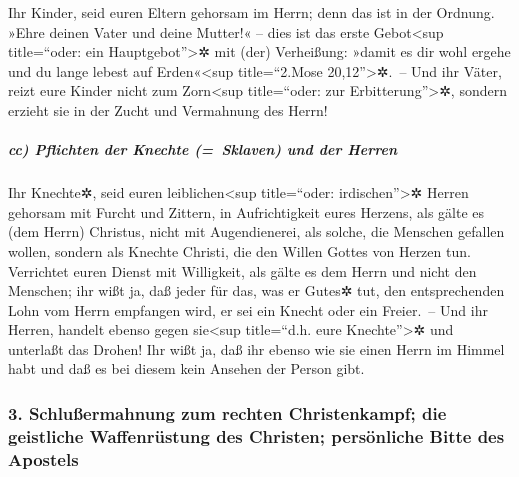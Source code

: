  Ihr Kinder, seid euren Eltern gehorsam im Herrn; denn das
ist in der Ordnung.  »Ehre deinen Vater und deine Mutter!«
-- dies ist das erste Gebot\textless sup title=``oder: ein
Hauptgebot''\textgreater✲ mit (der) Verheißung:  »damit es
dir wohl ergehe und du lange lebest auf Erden«\textless sup
title=``2.Mose 20,12''\textgreater✲.~--  Und ihr Väter,
reizt eure Kinder nicht zum Zorn\textless sup title=``oder: zur
Erbitterung''\textgreater✲, sondern erzieht sie in der Zucht und
Vermahnung des Herrn!

\hypertarget{cc-pflichten-der-knechte-sklaven-und-der-herren}{%
\subparagraph{cc) Pflichten der Knechte (=~Sklaven) und der
Herren}\label{cc-pflichten-der-knechte-sklaven-und-der-herren}}

 Ihr Knechte✲, seid euren leiblichen\textless sup
title=``oder: irdischen''\textgreater✲ Herren gehorsam mit Furcht und
Zittern, in Aufrichtigkeit eures Herzens, als gälte es (dem Herrn)
Christus,  nicht mit Augendienerei, als solche, die
Menschen gefallen wollen, sondern als Knechte Christi, die den Willen
Gottes von Herzen tun.  Verrichtet euren Dienst mit
Willigkeit, als gälte es dem Herrn und nicht den Menschen;
 ihr wißt ja, daß jeder für das, was er Gutes✲ tut, den
entsprechenden Lohn vom Herrn empfangen wird, er sei ein Knecht oder ein
Freier.~--  Und ihr Herren, handelt ebenso gegen
sie\textless sup title=``d.h. eure Knechte''\textgreater✲ und unterlaßt
das Drohen! Ihr wißt ja, daß ihr ebenso wie sie einen Herrn im Himmel
habt und daß es bei diesem kein Ansehen der Person gibt.

\hypertarget{schluuxdfermahnung-zum-rechten-christenkampf-die-geistliche-waffenruxfcstung-des-christen-persuxf6nliche-bitte-des-apostels}{%
\subsubsection{3. Schlußermahnung zum rechten Christenkampf; die
geistliche Waffenrüstung des Christen; persönliche Bitte des
Apostels}\label{schluuxdfermahnung-zum-rechten-christenkampf-die-geistliche-waffenruxfcstung-des-christen-persuxf6nliche-bitte-des-apostels}}

